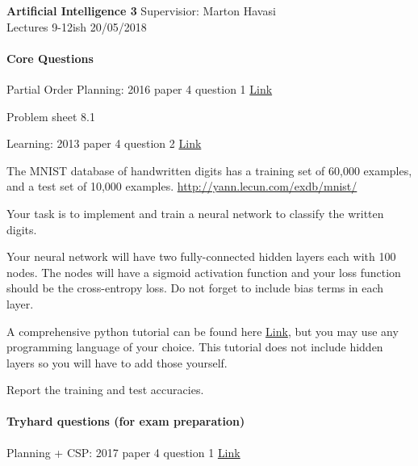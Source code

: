 \documentclass{exam}
\begin{document}
\noindent
\large\textbf{Artificial Intelligence 3} \hfill Supervisior: Marton Havasi \\
\normalsize Lectures 9-12ish \hfill 20/05/2018

\paragraph{Core Questions}
\begin{questions}

\question Partial Order Planning: 2016 paper 4 question 1 \href{http://www.cl.cam.ac.uk/teaching/exams/pastpapers/y2016p4q1.pdf}{Link}

\question Problem sheet 8.1 

\question Learning: 2013 paper 4 question 2 \href{http://www.cl.cam.ac.uk/teaching/exams/pastpapers/y2013p4q2.pdf}{Link} 

\question The MNIST database of handwritten digits has a training set of 60,000 examples, and a test set of 10,000 examples. \href{http://yann.lecun.com/exdb/mnist/}{http://yann.lecun.com/exdb/mnist/}

Your task is to implement and train a neural network to classify the written digits.

Your neural network will have two fully-connected hidden layers each with 100 nodes. The nodes will have a sigmoid activation function and your loss function should be the cross-entropy loss. Do not forget to include bias terms in each layer.

A comprehensive python tutorial can be found here \href{https://www.tensorflow.org/versions/r1.0/get_started/mnist/beginners}{Link}, but you may use any programming language of your choice. This tutorial does not include hidden layers so you will have to add those yourself.

Report the training and test accuracies.
\end{questions}

\paragraph{Tryhard questions (for exam preparation)}
\begin{questions}
\question Planning + CSP: 2017 paper 4 question 1 \href{http://www.cl.cam.ac.uk/teaching/exams/pastpapers/y2017p4q1.pdf}{Link} 

\end{questions}
\end{document}
